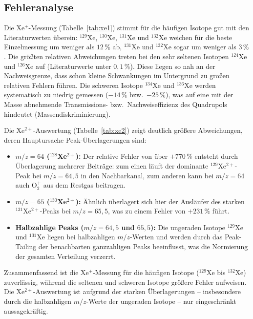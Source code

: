 \documentclass{article}
\begin{document}
\subsection*{Fehleranalyse}

Die Xe$^+$-Messung (Tabelle~\ref{tab:xe1}) stimmt für die häufigen
Isotope gut mit den Literaturwerten überein: $^{129}$Xe, $^{130}$Xe,
$^{131}$Xe und $^{132}$Xe weichen für die beste Einzelmessung um
weniger als $12\,\%$ ab, $^{131}$Xe und $^{132}$Xe sogar um weniger
als $3\,\%$.
Die größten relativen Abweichungen treten bei den sehr seltenen
Isotopen $^{124}$Xe und $^{126}$Xe auf (Literaturwerte unter $0{,}1\,\%$).
Diese liegen so nah an der Nachweisgrenze, dass schon kleine
Schwankungen im Untergrund zu großen relativen Fehlern führen.
Die schweren Isotope $^{134}$Xe und $^{136}$Xe werden systematisch zu
niedrig gemessen ($-14\,\%$ bzw.\ $-25\,\%$), was auf eine mit der
Masse abnehmende Transmissions- bzw.\ Nachweiseffizienz des Quadrupols
hindeutet (Massendiskriminierung).

Die Xe$^{2+}$-Auswertung (Tabelle~\ref{tab:xe2}) zeigt deutlich
größere Abweichungen, deren Hauptursache Peak-Überlagerungen sind:

\begin{itemize}
    \item \textbf{$m/z = 64$ ($^{128}$Xe$^{2+}$):}
        Der relative Fehler von über $+770\,\%$ entsteht durch
        Überlagerung mehrerer Beiträge: zum einen läuft der dominante
        $^{129}$Xe$^{2+}$-Peak bei $m/z = 64{,}5$ in den Nachbarkanal,
        zum anderen kann bei $m/z = 64$ auch O$_2^+$ aus dem
        Restgas beitragen.
    \item \textbf{$m/z = 65$ ($^{130}$Xe$^{2+}$):}
        Ähnlich überlagert sich hier der Ausläufer des starken
        $^{131}$Xe$^{2+}$-Peaks bei $m/z = 65{,}5$, was zu einem
        Fehler von $+231\,\%$ führt.
    \item \textbf{Halbzahlige Peaks ($m/z = 64{,}5$ und $65{,}5$):}
        Die ungeraden Isotope $^{129}$Xe und $^{131}$Xe liegen bei
        halbzahligen $m/z$-Werten und werden durch das Peak-Tailing
        der benachbarten ganzzahligen Peaks beeinflusst, was die
        Normierung der gesamten Verteilung verzerrt.
\end{itemize}

Zusammenfassend ist die Xe$^+$-Messung für die häufigen Isotope
($^{129}$Xe bis $^{132}$Xe) zuverlässig, während die seltenen und
schweren Isotope größere Fehler aufweisen.
Die Xe$^{2+}$-Auswertung ist aufgrund der starken Überlagerungen --
insbesondere durch die halbzahligen $m/z$-Werte der ungeraden Isotope --
nur eingeschränkt aussagekräftig.
\end{document}
